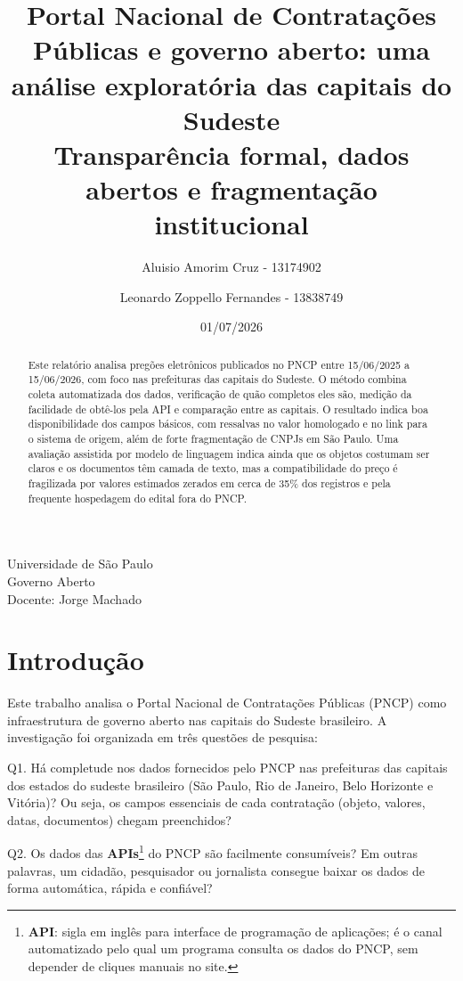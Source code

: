\documentclass[12pt]{article}
\title{Portal Nacional de Contratações Públicas e governo aberto: uma
análise exploratória das capitais do Sudeste\\\large Transparência
formal, dados abertos e fragmentação institucional}
\author{Aluisio Amorim Cruz - 13174902 \and Leonardo Zoppello Fernandes
- 13838749}
\date{01/07/2026}
\begin{document}
\maketitle

\begin{abstract}
Este relatório analisa pregões eletrônicos publicados no PNCP entre
15/06/2025 a 15/06/2026, com foco nas prefeituras das capitais do
Sudeste. O método combina coleta automatizada dos dados, verificação de
quão completos eles são, medição da facilidade de obtê-los pela API e
comparação entre as capitais. O resultado indica boa disponibilidade dos
campos básicos, com ressalvas no valor homologado e no link para o
sistema de origem, além de forte fragmentação de CNPJs em São Paulo. Uma
avaliação assistida por modelo de linguagem indica ainda que os objetos
costumam ser claros e os documentos têm camada de texto, mas a
compatibilidade do preço é fragilizada por valores estimados zerados em
cerca de 35\% dos registros e pela frequente hospedagem do edital fora
do PNCP.
\end{abstract}

\begin{center}
Universidade de São Paulo\\
Governo Aberto\\
Docente: Jorge Machado
\end{center}

\tableofcontents

\thispagestyle{empty}
\newpage
{}

\section{Introdução}\label{introduuxe7uxe3o}

Este trabalho analisa o Portal Nacional de Contratações Públicas (PNCP)
como infraestrutura de governo aberto nas capitais do Sudeste
brasileiro. A investigação foi organizada em três questões de pesquisa:

Q1. Há completude nos dados fornecidos pelo PNCP nas prefeituras das
capitais dos estados do sudeste brasileiro (São Paulo, Rio de Janeiro,
Belo Horizonte e Vitória)? Ou seja, os campos essenciais de cada
contratação (objeto, valores, datas, documentos) chegam preenchidos?

Q2. Os dados das \textbf{APIs}\footnote{\textbf{API}: sigla em inglês
  para interface de programação de aplicações; é o canal automatizado
  pelo qual um programa consulta os dados do PNCP, sem depender de
  cliques manuais no site.} do PNCP são facilmente consumíveis? Em
outras palavras, um cidadão, pesquisador ou jornalista consegue baixar
os dados de forma automática, rápida e confiável?
\end{document}
